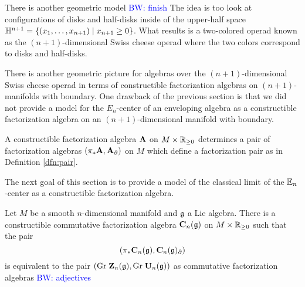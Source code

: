 \documentclass[11pt]{amsart}
\numberwithin{equation}{section}
\def\brian{\textcolor{blue}{BW: }\textcolor{blue}}
\begin{document}
There is another geometric model \brian{finish}
The idea is too look at configurations of disks and half-disks inside of the upper-half space $\mathbb H^{n+1} = \{(x_1,\ldots, x_{n+1}) \; | \; x_{n+1} \geq 0\}$. 
What results is a two-colored operad known as the $(n+1)$-dimensional Swiss cheese operad where the two colors correspond to disks and half-disks. 

There is another geometric picture for algebras over the $(n+1)$-dimensional Swiss cheese operad in terms of constructible factorization algebras on $(n+1)$-manifolds with boundary.
One drawback of the previous section is that we did not provide a model for the $E_n$-center of an enveloping algebra as a constructible factorization algebra on an $(n+1)$-dimensional manifold with boundary. 

A constructible factorization algebra $\mathbf A$ on $M \times \mathbb R_{\geq 0}$ determines a pair of factorization algebras $(\pi_* \mathbf A , \mathbf A_{\partial})$ on $M$ which define a factorization pair as in Definition \ref{dfn:pair}.

The next goal of this section is to provide a model of the classical limit of the $\mathbb E_n$-center as a constructible factorization algebra. 


\begin{prp}
Let $M$ be a smooth $n$-dimensional manifold and $\mathfrak g$ a Lie algebra. 
There is a constructible commutative factorization algebra ${\bf C}_n (\mathfrak g)$
on $M \times \mathbb R_{\geq 0}$ such that the pair 
\[
(\pi_* {\bf C}_n (\mathfrak g), {\bf C}_n (\mathfrak g)_\partial)
\]
is equivalent to the pair $({\rm Gr} \; \mathbf Z_n(\mathfrak g), {\rm Gr} \; \mathbf U_n(\mathfrak g))$ as commutative factorization algebras \brian{adjectives}
\end{prp}

\end{document}
